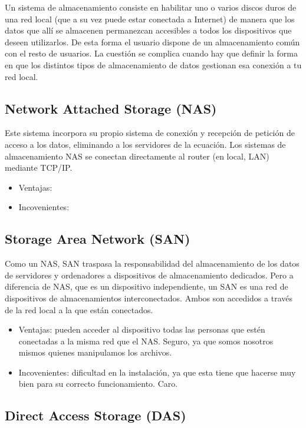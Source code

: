 Un sistema de almacenamiento consiste en habilitar uno o varios discos duros de una red local (que a su vez puede estar conectada a Internet) de manera que los datos que allí se almacenen permanezcan accesibles a todos los dispositivos que deseen utilizarlos. De esta forma el usuario dispone de un almacenamiento común con el resto de usuarios.
La cuestión se complica cuando hay que definir la forma en que los distintos tipos de almacenamiento de datos gestionan esa conexión a tu red local.

\subsection{Network Attached Storage (NAS)}

Este sistema incorpora su propio sistema de conexión y recepción de petición de acceso a los datos, eliminando a los servidores de la ecuación. Los sistemas de almacenamiento NAS se conectan directamente al router (en local, LAN) mediante TCP/IP.

\begin{itemize}
\item Ventajas: 
\item Incovenientes: 
\end{itemize}
\subsection{Storage Area Network (SAN)}


Como un NAS, SAN traspasa la responsabilidad del almacenamiento de los datos de servidores y ordenadores a dispositivos de almacenamiento dedicados. Pero a diferencia de NAS, que es un dispositivo independiente, un SAN es una red de dispositivos de almacenamientos interconectados. Ambos son accedidos a través de la red local a la que están conectados.

\begin{itemize}
\item Ventajas: pueden acceder al dispositivo todas las personas que estén conectadas a la misma red que el NAS. Seguro, ya que somos nosotros mismos quienes manipulamos los archivos.
\item Incovenientes: dificultad en la instalación, ya que esta tiene que hacerse muy bien para su correcto funcionamiento. Caro.
\end{itemize}

\subsection{Direct Access Storage (DAS)}

